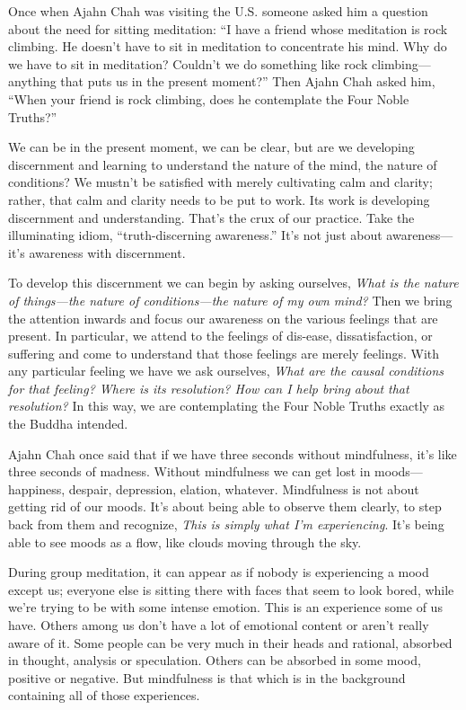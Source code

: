Once when Ajahn Chah was visiting the U.S. someone asked him a question 
about the need for sitting meditation: ``I have a friend whose 
meditation is rock climbing. He doesn't have to sit in meditation to 
concentrate his mind. Why do we have to sit in meditation? Couldn't we 
do something like rock climbing---anything that puts us in the present 
moment?'' Then Ajahn Chah asked him, ``When your friend is rock 
climbing, does he contemplate the Four Noble Truths?''

We can be in the present moment, we can be clear, but are we developing 
discernment and learning to understand the nature of the mind, the 
nature of conditions? We mustn't be satisfied with merely cultivating 
calm and clarity; rather, that calm and clarity needs to be put to 
work. Its work is developing discernment and understanding. That's the 
crux of our practice. Take the illuminating idiom, ``truth-discerning 
awareness.'' It's not just about awareness---it's awareness with 
discernment.

To develop this discernment we can begin by asking ourselves, 
\emph{What is the nature of things---the nature of conditions---the 
nature of my own mind?} Then we bring the attention inwards and focus 
our awareness on the various feelings that are present. In particular, 
we attend to the feelings of dis-ease, dissatisfaction, or suffering 
and come to understand that those feelings are merely feelings. With 
any particular feeling we have we ask ourselves, \emph{What are the 
causal conditions for that feeling? Where is its resolution? How can I 
help bring about that resolution?} In this way, we are contemplating 
the Four Noble Truths exactly as the Buddha intended.


Ajahn Chah once said that if we have three seconds without mindfulness, 
it's like three seconds of madness. Without mindfulness we can get lost 
in moods---happiness, despair, depression, elation, whatever. 
Mindfulness is not about getting rid of our moods. It's about being 
able to observe them clearly, to step back from them and recognize, 
\emph{This is simply what I'm experiencing}. It's being able to see 
moods as a flow, like clouds moving through the sky.

During group meditation, it can appear as if nobody is experiencing a 
mood except us; everyone else is sitting there with faces that seem to 
look bored, while we're trying to be with some intense emotion. This is 
an experience some of us have. Others among us don't have a lot of 
emotional content or aren't really aware of it. Some people can be very 
much in their heads and rational, absorbed in thought, analysis or 
speculation. Others can be absorbed in some mood, positive or negative. 
But mindfulness is that which is in the background containing all of 
those experiences.

